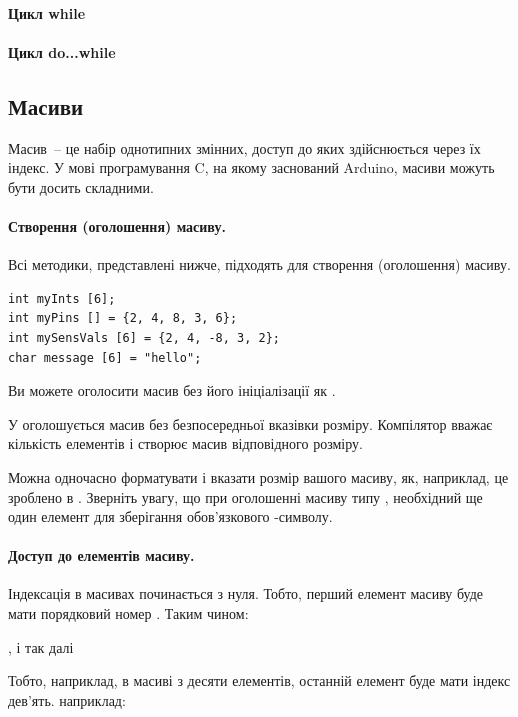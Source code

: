 \documentclass[12pt,a4paper]{report}  %
\begin{document}
\paragraph{Цикл while}
\paragraph{Цикл do...while}

\subsection{Масиви}

Масив~-- це набір однотипних змінних, доступ до яких здійснюється через їх індекс. У мові програмування C, на якому заснований Arduino, масиви можуть бути досить складними.

\paragraph{Створення (оголошення) масиву.} 
Всі методики, представлені нижче, підходять для створення (оголошення) масиву.

\begin{lstlisting}[label=conditionoperator,caption=Оголошення масиву]
int myInts [6];
int myPins [] = {2, 4, 8, 3, 6};
int mySensVals [6] = {2, 4, -8, 3, 2};
char message [6] = "hello";
\end{lstlisting}

Ви можете оголосити масив без його ініціалізації як .

У  оголошується масив без безпосередньої вказівки розміру. Компілятор вважає кількість елементів і створює масив відповідного розміру.

Можна одночасно форматувати і вказати розмір вашого масиву, як, наприклад, це зроблено в . Зверніть увагу, що при оголошенні масиву типу , необхідний ще один елемент для зберігання обов'язкового -символу.

\paragraph{Доступ до елементів масиву.}
Індексація в масивах починається з нуля. Тобто, перший елемент масиву буде мати порядковий номер . Таким чином:

, і так далі

Тобто, наприклад, в масиві з десяти елементів, останній елемент буде мати індекс дев'ять. наприклад:
\end{document}
